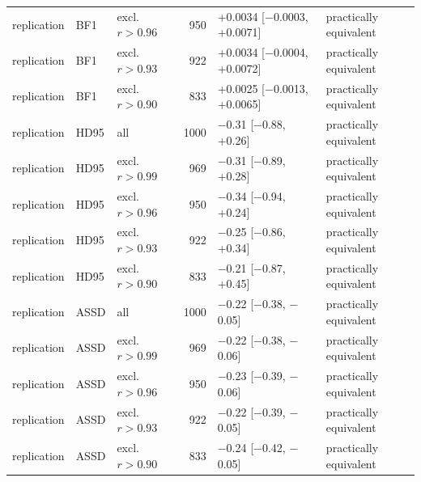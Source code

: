 \begin{tabular}{lllrll}
replication & BF1 & excl. $r>0.96$ & 950 & +0.0034 [$-$0.0003, +0.0071] & practically equivalent \\
replication & BF1 & excl. $r>0.93$ & 922 & +0.0034 [$-$0.0004, +0.0072] & practically equivalent \\
replication & BF1 & excl. $r>0.90$ & 833 & +0.0025 [$-$0.0013, +0.0065] & practically equivalent \\
replication & HD95 & all & 1000 & $-$0.31 [$-$0.88, +0.26] & practically equivalent \\
replication & HD95 & excl. $r>0.99$ & 969 & $-$0.31 [$-$0.89, +0.28] & practically equivalent \\
replication & HD95 & excl. $r>0.96$ & 950 & $-$0.34 [$-$0.94, +0.24] & practically equivalent \\
replication & HD95 & excl. $r>0.93$ & 922 & $-$0.25 [$-$0.86, +0.34] & practically equivalent \\
replication & HD95 & excl. $r>0.90$ & 833 & $-$0.21 [$-$0.87, +0.45] & practically equivalent \\
replication & ASSD & all & 1000 & $-$0.22 [$-$0.38, $-$0.05] & practically equivalent \\
replication & ASSD & excl. $r>0.99$ & 969 & $-$0.22 [$-$0.38, $-$0.06] & practically equivalent \\
replication & ASSD & excl. $r>0.96$ & 950 & $-$0.23 [$-$0.39, $-$0.06] & practically equivalent \\
replication & ASSD & excl. $r>0.93$ & 922 & $-$0.22 [$-$0.39, $-$0.05] & practically equivalent \\
replication & ASSD & excl. $r>0.90$ & 833 & $-$0.24 [$-$0.42, $-$0.05] & practically equivalent \\
\bottomrule
\end{tabular}
